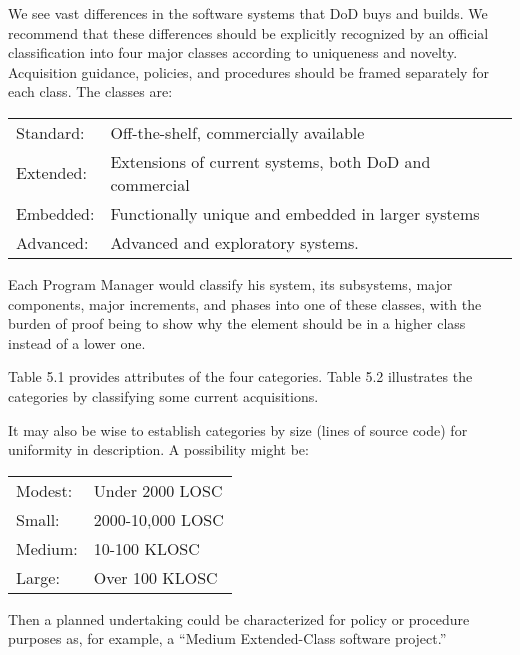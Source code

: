 \documentclass[11pt,final]{article}
\begin{document}
We see vast differences in the software systems that DoD buys and builds. We
recommend that these differences should be explicitly recognized by an official
classification into four major classes according to uniqueness and novelty.
Acquisition guidance, policies, and procedures should be framed separately for
each class. The classes are:

\begin{center}
    \begin{tabular}{ l l }
Standard: & Off-the-shelf, commercially available \\

Extended: & Extensions of current systems, both DoD and commercial \\

Embedded: & Functionally unique and embedded in larger systems \\

Advanced: & Advanced and exploratory systems. \\
    \end{tabular}
\end{center}

Each Program Manager would classify his system, its subsystems, major
components, major increments, and phases into one of these classes, with the
burden of proof being to show why the element should be in a higher class
instead of a lower one.

Table 5.1 provides attributes of the four categories. Table 5.2 illustrates the
categories by classifying some current acquisitions.

It may also be wise to establish categories by size (lines of source code) for
uniformity in description. A possibility might be:

\begin{center}
    \begin{tabular}{ l l }
Modest: & Under 2000 LOSC\\

Small: & 2000-10,000 LOSC\\

Medium: & 10-100 KLOSC\\

Large: & Over 100 KLOSC\\
    \end{tabular}
\end{center}

Then a planned undertaking could be characterized for policy or procedure purposes
as, for example, a “Medium Extended-Class software project.”
\end{document}

